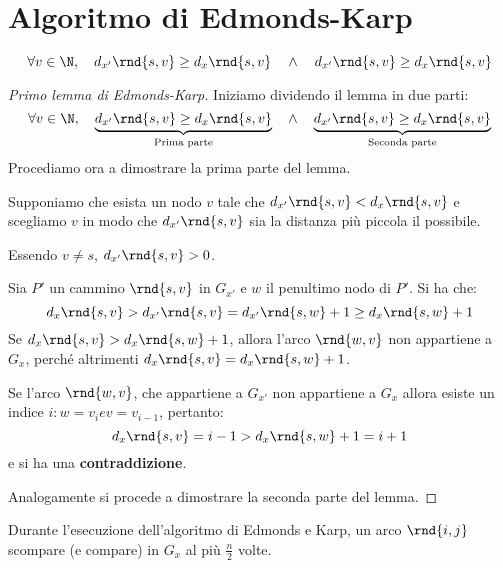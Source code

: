 \documentclass[\main/main.tex]{subfiles}
\begin{document}
\section{Algoritmo di Edmonds-Karp}
\begin{lemma}\label{first_lemma_karp}
  \[
    \forall v \in \N, \quad d_{x'}\rnd{s, v} \geq d_{x}\rnd{s, v} \quad \land \quad d_{x'}\rnd{s, v} \geq d_{x}\rnd{s, v}
  \]
\end{lemma}
\begin{proof}[Primo lemma di Edmonds-Karp]
  Iniziamo dividendo il lemma in due parti:
  \[
    \forall v \in \N, \quad \underbrace{d_{x'}\rnd{s, v} \geq d_{x}\rnd{s, v}}_{\text{Prima parte}} \quad \land \quad \underbrace{d_{x'}\rnd{s, v} \geq d_{x}\rnd{s, v}}_{\text{Seconda parte}}
  \]
  Procediamo ora a dimostrare la prima parte del lemma.

  Supponiamo che esista un nodo \(v\) tale che \(d_{x'}\rnd{s, v} < d_x\rnd{s, v}\) e scegliamo \(v\) in modo che \(d_{x'}\rnd{s, v}\) sia la distanza più piccola il possibile.

  Essendo \(v \neq s\), \(d_{x'}\rnd{s, v} > 0\).

  Sia \(P'\) un cammino \(\rnd{s, v}\) in \(G_{x'}\) e \(w\) il penultimo nodo di \(P'\). Si ha che:
  \[
    d_{x}\rnd{s, v} > d_{x'}\rnd{s, v} = d_{x'}\rnd{s, w} + 1 \geq d_{x}\rnd{s, w} + 1
  \]
  Se \(d_{x}\rnd{s, v} > d_{x}\rnd{s, w} + 1\), allora l'arco \(\rnd{w, v}\) non appartiene a \(G_x\), perché altrimenti \(d_x\rnd{s, v} = d_x\rnd{s, w}+1\).

  Se l'arco \(\rnd{w, v}\), che appartiene a \(G_{x'}\) non appartiene a \(G_x\) allora esiste un indice \(i: w = v_ i e v = v_{i-1}\), pertanto:
  \[
    d_{x}\rnd{s, v} = i -1 > d_{x}\rnd{s, w} + 1 = i+1
  \]
  e si ha una \textbf{contraddizione}.

  Analogamente si procede a dimostrare la seconda parte del lemma.
\end{proof}
\begin{lemma}\label{second_lemma_karp}
  Durante l'esecuzione dell'algoritmo di Edmonds e Karp, un arco \(\rnd{i,j}\) scompare (e compare) in \(G_{x}\) al più \(\frac{n}{2}\) volte.
\end{lemma}
\end{document}
